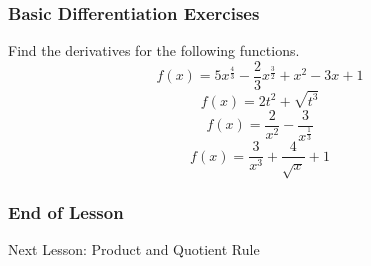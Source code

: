 \documentclass[xcolor=dvipsnames]{beamer}
\begin{document}
\begin{frame}
  \frametitle{Basic Differentiation Exercises}
{\ubung} Find the derivatives for the following functions.
\begin{equation}
  \label{eq:ohzahcer}
  f(x)=5x^{\frac{4}{3}}-\frac{2}{3}x^{\frac{3}{2}}+x^{2}-3x+1
\end{equation}
\begin{equation}
  \label{eq:mothoofi}
f(x)=2t^{2}+\sqrt{t^{3}}
\end{equation}
\begin{equation}
  \label{eq:aiquooyo}
  f(x)=\frac{2}{x^{2}}-\frac{3}{x^{\frac{1}{3}}}
\end{equation}
\begin{equation}
  \label{eq:achaingo}
f(x)=\frac{3}{x^{3}}+\frac{4}{\sqrt{x}}+1
\end{equation}
\end{frame}

\begin{frame}
  \frametitle{End of Lesson}
Next Lesson: Product and Quotient Rule
\end{frame}
\end{document}
